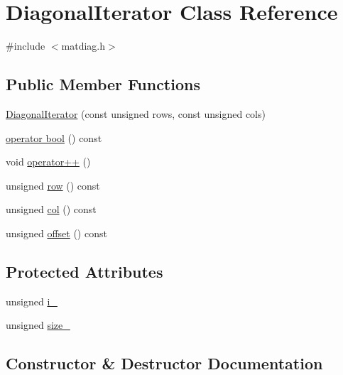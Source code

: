 \hypertarget{classDiagonalIterator}{}\section{Diagonal\+Iterator Class Reference}
\label{classDiagonalIterator}


{\ttfamily \#include $<$matdiag.\+h$>$}

\subsection*{Public Member Functions}
\begin{DoxyCompactItemize}
\item 
\hyperlink{classDiagonalIterator_ab597a6143fdf97c0409da8fbe34ab14a}{Diagonal\+Iterator} (const unsigned rows, const unsigned cols)
\item 
\hyperlink{classDiagonalIterator_a827ab8b36dd2b90282cdae120022f5e0}{operator bool} () const 
\item 
void \hyperlink{classDiagonalIterator_aaa9b8a1c7f7928ae024990055b89855e}{operator++} ()
\item 
unsigned \hyperlink{classDiagonalIterator_a75e19c42b907b3159663fadfe65fc35c}{row} () const 
\item 
unsigned \hyperlink{classDiagonalIterator_a47ff15c663b1e0c1d32e1752b34e8dcc}{col} () const 
\item 
unsigned \hyperlink{classDiagonalIterator_a1da06d3ae5a2d68879f0f265a90996a3}{offset} () const 
\end{DoxyCompactItemize}
\subsection*{Protected Attributes}
\begin{DoxyCompactItemize}
\item 
unsigned \hyperlink{classDiagonalIterator_a2ba8f4c0ec1c388e9071044fcd37c3a7}{i\+\_\+}
\item 
unsigned \hyperlink{classDiagonalIterator_a449e656511e2d61e50d878debe597300}{size\+\_\+}
\end{DoxyCompactItemize}


\subsection{Constructor \& Destructor Documentation}
\hypertarget{classDiagonalIterator_ab597a6143fdf97c0409da8fbe34ab14a}{}
